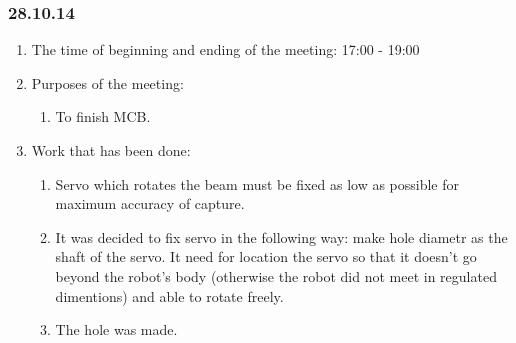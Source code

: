 
\subsubsection{28.10.14}

\begin{enumerate}
	\item The time of beginning and ending of the meeting:
	17:00 - 19:00
	\item Purposes of the meeting:
	\begin{enumerate}
	  \item To finish MCB.
	  
    \end{enumerate}
    
	\item Work that has been done:
	\begin{enumerate}
	  \item Servo which rotates the beam must be fixed as low as possible for maximum accuracy of capture.
      
      \item It was decided to fix servo in the following way: make hole diametr as the shaft of the servo. It need for location the servo so that it doesn't go beyond the robot's body (otherwise the robot did not meet in regulated dimentions) and able to rotate freely.
      
      \item The hole was made.
      

\end{enumerate}
\end{enumerate}
